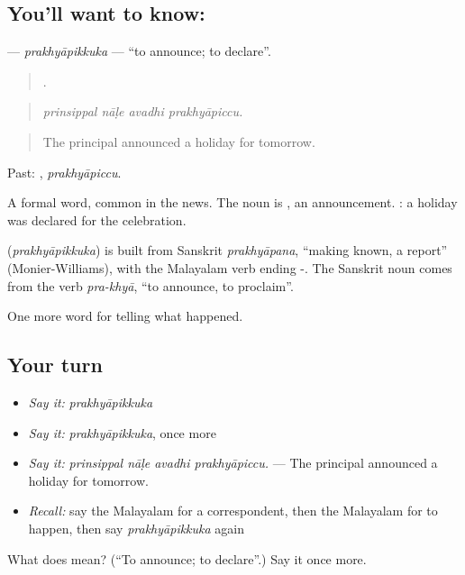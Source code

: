 \subsection*{You'll want to know: }
\textbf{} — \emph{prakhyāpikkuka} — \textquotedblleft{}to announce; to declare\textquotedblright{}.

\begin{quote}
   .
\end{quote}

\begin{quote}
\emph{prinsippal nāḷe avadhi prakhyāpiccu.}
\end{quote}

\begin{quote}
The principal announced a holiday for tomorrow.
\end{quote}

Past: , \emph{prakhyāpiccu}.

A formal word, common in the news. The noun is , an announcement.   : a holiday was declared for the celebration.

\begin{cousinweb}
\textbf{} (\emph{prakhyāpikkuka}) is built from Sanskrit \emph{prakhyāpana}, \textquotedblleft{}making known, a report\textquotedblright{} (Monier-Williams), with the Malayalam verb ending -. The Sanskrit noun comes from the verb \emph{pra-khyā}, \textquotedblleft{}to announce, to proclaim\textquotedblright{}.
\end{cousinweb}

\begin{grammarlens}[title={What you've built}]
One more word for telling what happened.
\end{grammarlens}

\subsection*{Your turn}
\begin{itemize}
\raggedright
  \item \emph{Say it:} \emph{prakhyāpikkuka}
  \item \emph{Say it:} \emph{prakhyāpikkuka}, once more
  \item \emph{Say it:} \emph{prinsippal nāḷe avadhi prakhyāpiccu.} — The principal announced a holiday for tomorrow.
  \item \emph{Recall:} say the Malayalam for a correspondent, then the Malayalam for to happen, then say \emph{prakhyāpikkuka} again
\end{itemize}

\begin{tcolorbox}[breakable,colback=teal!4,colframe=teal!35!black,title={Before you move on}]
What does  mean? (\textquotedblleft{}To announce; to declare\textquotedblright{}.) Say it once more.
\end{tcolorbox}
